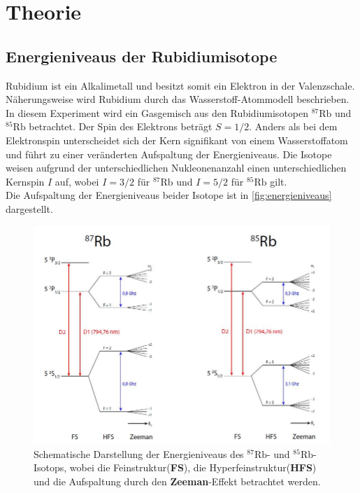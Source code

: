 \section{Theorie}
\label{sec:Theorie}

\subsection{Energieniveaus der Rubidiumisotope}
Rubidium ist ein Alkalimetall und besitzt somit ein Elektron in der Valenzschale.
Näherungsweise wird Rubidium durch das Wasserstoff-Atommodell beschrieben.
In diesem Experiment wird ein Gasgemisch aus den Rubidiumisotopen $^{87}\text{Rb}$ und $^{85}\text{Rb}$ betrachtet.
Der Spin des Elektrons beträgt $S=1/2$.
Anders als bei dem Elektronspin unterscheidet sich der Kern signifikant von einem Wasserstoffatom und führt zu einer veränderten Aufspaltung der Energieniveaus.
Die Isotope weisen aufgrund der unterschiedlichen Nukleonenanzahl einen unterschiedlichen Kernspin $I$ auf, wobei $I=3/2$ für $^{87}\text{Rb}$ und $I=5/2$ für $^{85}\text{Rb}$ gilt.
\\
Die Aufspaltung der Energieniveaus beider Isotope ist in \autoref{fig:energieniveaus} dargestellt.
\begin{figure}
    \centering
    \includegraphics[width=1\textwidth]{content/img/energieniveaus2.png}
    \caption{Schematische Darstellung der Energieniveaus des $^{87}\text{Rb}$- und $^{85}\text{Rb}$-Isotops, 
    wobei die Feinstruktur(\textbf{FS}), die Hyperfeinstruktur(\textbf{HFS}) und die Aufspaltung durch den \textbf{Zeeman}-Effekt betrachtet werden. \cite{borgo}}
    \label{fig:energieniveaus}
\end{figure}
